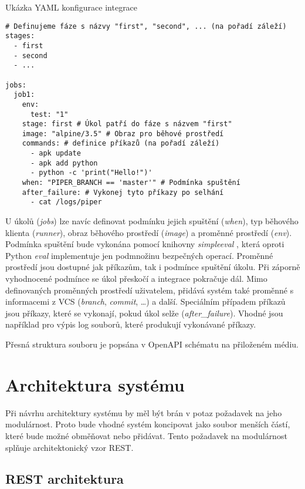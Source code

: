 \begin{listing}[ht]
\caption{\label{code:piper-yml-example}Ukázka YAML konfigurace integrace}
\begin{verbatim}
# Definujeme fáze s názvy "first", "second", ... (na pořadí záleží)
stages:
  - first
  - second
  - ...

jobs:
  job1:
    env:
      test: "1"
    stage: first # Úkol patří do fáze s názvem "first"
    image: "alpine/3.5" # Obraz pro běhové prostředí
    commands: # definice příkazů (na pořadí záleží)
      - apk update
      - apk add python
      - python -c 'print("Hello!")'
    when: "PIPER_BRANCH == 'master'" # Podmínka spuštění
    after_failure: # Vykonej tyto příkazy po selhání
      - cat /logs/piper
\end{verbatim}
\end{listing}

U úkolů (\textit{jobs}) lze navíc definovat podmínku jejich spuštění (\textit{when}), typ běhového klienta (\textit{runner}), obraz běhového prostředí (\textit{image}) a proměnné prostředí (\textit{env}).
Podmínka spuštění bude vykonána pomocí knihovny \textit{simpleeval} \cite{simple_eval}, která oproti Python \textit{eval} implementuje jen podmnožinu bezpečných operací.
Proměnné prostředí jsou dostupné jak příkazům, tak i podmínce spuštění úkolu.
Při záporně vyhodnocené podmínce se úkol přeskočí a integrace pokračuje dál.
Mimo definovaných proměnných prostředí uživatelem, přidává systém také proměnné s informacemi z VCS (\textit{branch}, \textit{commit}, \ldots) a další.
Speciálním případem příkazů jsou příkazy, které se vykonají, pokud úkol selže (\textit{after\_failure}).
Vhodné jsou například pro výpis log souborů, které produkují vykonávané příkazy.

Přesná struktura souboru je popsána v OpenAPI \cite{openapi} schématu na přiloženém médiu.

\section{Architektura systému}

Při návrhu architektury systému by měl být brán v potaz požadavek na jeho modulárnost.
Proto bude vhodné systém koncipovat jako soubor menších částí, které bude možné obměňovat nebo přidávat.
Tento požadavek na modulárnost splňuje architektonický vzor REST.

\subsection{REST architektura}

